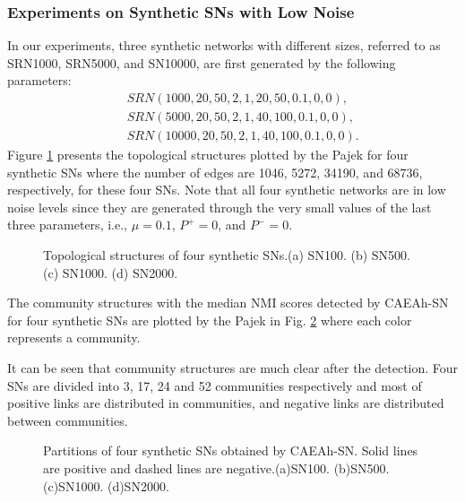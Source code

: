 \documentclass[10pt, journal]{IEEEtran}
\begin{document}
\subsubsection{Experiments on Synthetic SNs with Low Noise}\label{section:experiment:synthetic:results}
In our experiments, three synthetic networks with different sizes, referred to as SRN1000, SRN5000, and SN10000, are first generated by the following parameters:
\begin{eqnarray}\label{eqn:generation 4size networks}
&&SRN(1000,20,50,2,1,20,50,0.1,0,0),  \\
&&SRN(5000,20,50,2,1,40,100,0.1,0,0),  \\
&&SRN(10000,20,50,2,1,40,100,0.1,0,0).
\end{eqnarray}
Figure \ref{fig:CAEAh-SN:SN} presents the topological structures plotted by the Pajek for four synthetic SNs where the number of edges are 1046, 5272, 34190, and 68736, respectively, for these four SNs.
Note that all four synthetic networks are in low noise levels since they are generated through the very small values of the last three parameters, i.e., $\mu=0.1$, $P^+=0$, and $P^-=0$.
\begin{figure}[!htbp]
 	\centering
 	\caption{Topological structures of four synthetic SNs.(a) SN100. (b) SN500. (c) SN1000. (d) SN2000.}
 	\label{fig:CAEAh-SN:SN}
 \end{figure}

The community structures with the median NMI scores detected by CAEAh-SN for four synthetic SNs are plotted by the Pajek in Fig. \ref{fig:CAEAh-SN:SNfinish} where
each color represents a community.

It can be seen that community structures are much clear after the detection. Four SNs are divided into 3, 17, 24 and 52 communities respectively and most of positive links are distributed in communities, and negative links are distributed between communities.
\begin{figure}[!htbp]
 	\centering
 	\caption{Partitions of four synthetic SNs obtained by CAEAh-SN. Solid lines are positive and dashed lines are negative.(a)SN100. (b)SN500. (c)SN1000. (d)SN2000.}
 	\label{fig:CAEAh-SN:SNfinish}
 \end{figure}
\end{document}
